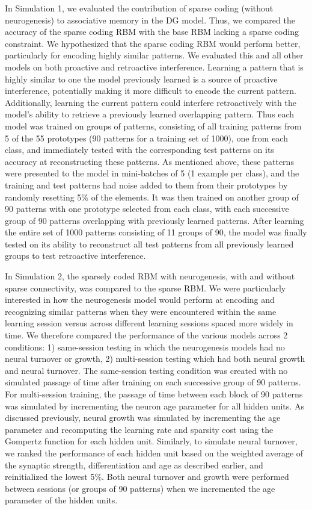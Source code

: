 In Simulation 1, we evaluated the
contribution of sparse coding (without neurogenesis) to associative 
memory in the \ac{DG} model. 
Thus, we compared 
the accuracy of the sparse coding \ac{RBM} with the base \ac{RBM} lacking a sparse
coding constraint. 
We hypothesized that the sparse coding \ac{RBM} would perform better, 
particularly for encoding highly similar patterns.
We evaluated this and all other models on both proactive and retroactive
interference. 
Learning a pattern that is highly
similar to one the model previously learned is a source of proactive
interference, potentially making it more difficult to encode the current
pattern. 
Additionally, learning the current pattern could interfere
retroactively with the model's ability to retrieve a previously learned
overlapping pattern. 
Thus each model was trained on groups of patterns, consisting 
of all training patterns from 5 of the 55 prototypes (90 patterns for a training set of 1000), 
one from each class, and immediately 
tested with the corresponding test patterns on its accuracy at reconstructing these patterns. 
As mentioned above, these patterns were presented to the model in mini-batches of 5 (1 example per class), 
and the training and test patterns had noise added to them from their prototypes by randomly resetting 5\% of the elements. 
It was then trained on another group of 90 patterns with one prototype selected from each class, 
with each successive group of 90 patterns overlapping with previously learned patterns. 
After learning the entire set of 1000 patterns consisting of 11 groups of 90, the model was 
finally tested on its ability to reconstruct all test patterns from all previously learned groups to test 
retroactive interference.

In Simulation 2, the sparsely coded \ac{RBM} with
neurogenesis, with and without sparse connectivity, was compared to the sparse
\ac{RBM}. 
We were particularly interested in how the neurogenesis model would
perform at encoding and recognizing similar patterns when they were
encountered within the same learning session versus across different learning
sessions spaced more widely in time. 
We therefore compared the performance of
the various models across 2 conditions: 
1) same-session testing in which   
the neurogenesis models had no neural turnover or growth,
2) multi-session testing which had both neural growth and neural turnover.
The same-session testing condition was created with no simulated passage of
time after training on each successive group of 90 patterns. 
For multi-session training, the passage of
time between each block of 90 patterns was simulated by 
incrementing the neuron age parameter for all hidden units. 
As discussed previously, neural growth
was simulated by incrementing the age parameter and recomputing the learning
rate and sparsity cost using the Gompertz function for each hidden unit. 
Similarly, to simulate neural turnover, we
ranked the performance of each hidden unit based on the weighted average of the synaptic strength, 
differentiation and age as described earlier, and reinitialized the lowest 5\%. 
Both neural turnover and growth were performed between sessions (or groups of 90 patterns) when we incremented 
the age parameter of the hidden units.

